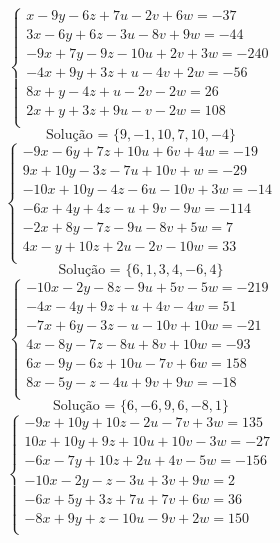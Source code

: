 \documentclass[12pt,oneside,a4paper]{article}
\begin{document}
\vspace{\baselineskip}
\begin{equation*}
\begin{cases}
x-9y-6z+7u-2v+6w=-37 \\
3x-6y+6z-3u-8v+9w=-44 \\
-9x+7y-9z-10u+2v+3w=-240 \\
-4x+9y+3z+u-4v+2w=-56 \\
8x+y-4z+u-2v-2w=26 \\
2x+y+3z+9u-v-2w=108 \\
\end{cases}
\end{equation*}
\begin{equation*}
\text{Solução = }\{9,-1,10,7,10,-4\}
\end{equation*}
\vspace{\baselineskip}
\begin{equation*}
\begin{cases}
-9x-6y+7z+10u+6v+4w=-19 \\
9x+10y-3z-7u+10v+w=-29 \\
-10x+10y-4z-6u-10v+3w=-14 \\
-6x+4y+4z-u+9v-9w=-114 \\
-2x+8y-7z-9u-8v+5w=7 \\
4x-y+10z+2u-2v-10w=33 \\
\end{cases}
\end{equation*}
\begin{equation*}
\text{Solução = }\{6,1,3,4,-6,4\}
\end{equation*}
\vspace{\baselineskip}
\begin{equation*}
\begin{cases}
-10x-2y-8z-9u+5v-5w=-219 \\
-4x-4y+9z+u+4v-4w=51 \\
-7x+6y-3z-u-10v+10w=-21 \\
4x-8y-7z-8u+8v+10w=-93 \\
6x-9y-6z+10u-7v+6w=158 \\
8x-5y-z-4u+9v+9w=-18 \\
\end{cases}
\end{equation*}
\begin{equation*}
\text{Solução = }\{6,-6,9,6,-8,1\}
\end{equation*}
\vspace{\baselineskip}
\begin{equation*}
\begin{cases}
-9x+10y+10z-2u-7v+3w=135 \\
10x+10y+9z+10u+10v-3w=-27 \\
-6x-7y+10z+2u+4v-5w=-156 \\
-10x-2y-z-3u+3v+9w=2 \\
-6x+5y+3z+7u+7v+6w=36 \\
-8x+9y+z-10u-9v+2w=150 \\
\end{cases}
\end{equation*}
\end{document}
